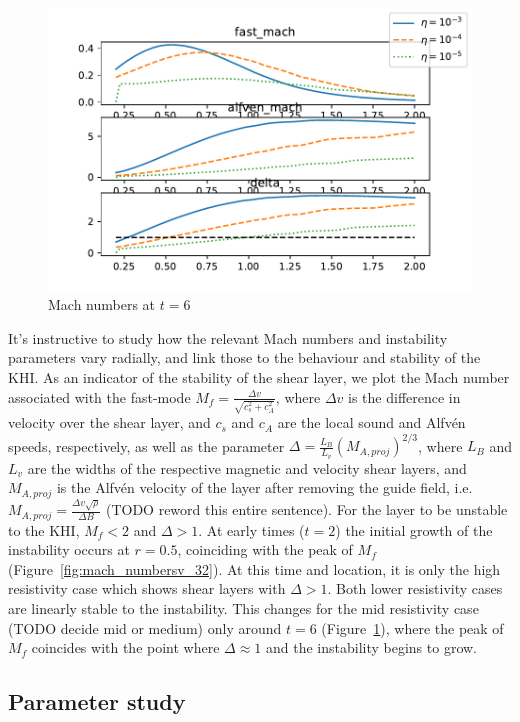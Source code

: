 \begin{figure}[h]
  \centering
  \includegraphics[width=0.8\linewidth]{./images/null_point_khi/mach_numbersv-36.pdf}
  \caption{Mach numbers at $t=6$}
  \label{fig:mach_numbersv-36}
\end{figure}

It's instructive to study how the relevant Mach numbers and instability parameters vary radially, and link those to the behaviour and stability of the KHI. As an indicator of the stability of the shear layer, we plot the Mach number associated with the fast-mode $M_f = \frac{\Delta v}{\sqrt{c_s^2 + c_A^2}}$, where $\Delta v$ is the difference in velocity over the shear layer, and $c_s$ and $c_A$ are the local sound and Alfv\'en speeds, respectively, as well as the parameter $\Delta = \frac{L_B}{L_v}(M_{A, proj})^{2/3}$, where $L_B$ and $L_v$ are the widths of the respective magnetic and velocity shear layers, and $M_{A, proj}$ is the Alfv\'en velocity of the layer after removing the guide field, i.e. $M_{A, proj} = \frac{\Delta v \sqrt{\rho}}{\Delta B}$ (TODO reword this entire sentence). For the layer to be unstable to the KHI, $M_f < 2$ and $\Delta > 1$. At early times ($t=2$) the initial growth of the instability occurs at $r=0.5$, coinciding with the peak of $M_f$ (Figure~\ref{fig:mach_numbersv_32}). At this time and location, it is only the high resistivity case which shows shear layers with $\Delta > 1$. Both lower resistivity cases are linearly stable to the instability. This changes for the mid resistivity case (TODO decide mid or medium) only around $t=6$ (Figure~\ref{fig:mach_numbersv-36}), where the peak of $M_f$ coincides with the point where $\Delta \approx 1$ and the instability begins to grow.


\subsection{Parameter study}


